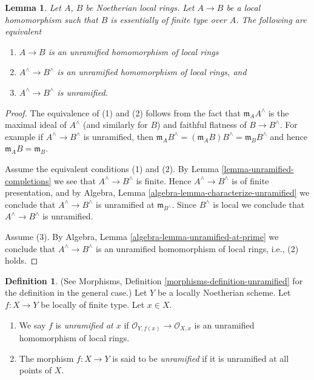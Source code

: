 \documentclass{stacks-project}
\theoremstyle{plain}
\newtheorem{lemma}[subsection]{Lemma}
\theoremstyle{definition}
\newtheorem{definition}[subsection]{Definition}
\theoremstyle{remark}
\numberwithin{equation}{subsection}
\begin{document}
\begin{lemma}
\label{lemma-characterize-unramified-completions}
Let $A$, $B$ be Noetherian local rings.
Let $A \to B$ be a local homomorphism such that $B$ is
essentially of finite type over $A$.
The following are equivalent
\begin{enumerate}
\item $A \to B$ is an unramified homomorphism of local rings
\item $A^\wedge \to B^\wedge$ is an unramified homomorphism of local rings, and
\item $A^\wedge \to B^\wedge$ is unramified.
\end{enumerate}
\end{lemma}

\begin{proof}
The equivalence of (1) and (2) follows from the fact that
$\mathfrak m_AA^\wedge$ is the maximal ideal of $A^\wedge$
(and similarly for $B$) and faithful flatness of $B \to B^\wedge$.
For example if $A^\wedge \to B^\wedge$ is unramified, then
$\mathfrak m_AB^\wedge = (\mathfrak m_AB)B^\wedge = \mathfrak m_BB^\wedge$
and hence $\mathfrak m_AB = \mathfrak m_B$.

\medskip\noindent
Assume the equivalent conditions (1) and (2).
By Lemma \ref{lemma-unramified-completions}
we see that $A^\wedge \to B^\wedge$ is
finite. Hence $A^\wedge \to B^\wedge$ is of finite presentation, and by
Algebra, Lemma \ref{algebra-lemma-characterize-unramified}
we conclude that $A^\wedge \to B^\wedge$ is unramified at
$\mathfrak m_{B^\wedge}$. Since $B^\wedge$ is local we conclude
that $A^\wedge \to B^\wedge$ is unramified.

\medskip\noindent
Assume (3). By Algebra, Lemma \ref{algebra-lemma-unramified-at-prime}
we conclude that $A^\wedge \to B^\wedge$ is an unramified homomorphism
of local rings, i.e., (2) holds.
\end{proof}

\begin{definition}
\label{definition-unramified-schemes}
(See Morphisms, Definition \ref{morphisms-definition-unramified}
for the definition in the general case.)
Let $Y$ be a locally Noetherian scheme.
Let $f : X \to Y$ be locally of finite type.
Let $x \in X$.
\begin{enumerate}
\item We say $f$ is {\it unramified at $x$} if
$\mathcal{O}_{Y, f(x)} \to \mathcal{O}_{X, x}$
is an unramified homomorphism of local rings.
\item The morphism $f : X \to Y$ is said to be {\it unramified}
if it is unramified at all points of $X$.
\end{enumerate}
\end{definition}
\end{document}
